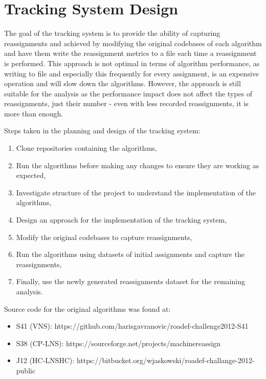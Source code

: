 \documentclass[a4paper,12pt]{Classes/RoboticsLaTeX}
\begin{document}
\section{Tracking System Design}

The goal of the tracking system is to provide the ability of capturing
reassignments and achieved by modifying the original codebases of each
algorithm and have them write the reassignment metrics to a file each
time a reassignment is performed. This approach is not optimal in terms
of algorithm performance, as writing to file and especially this
frequently for every assignment, is an expensive operation and will slow
down the algorithms. However, the approach is still suitable for the
analysis as the performance impact does not affect the types of
reassignments, just their number - even with less recorded
reassignments, it is more than enough.

Steps taken in the planning and design of the tracking system:

\begin{enumerate}
\def\labelenumi{\arabic{enumi}.}
\setlength\itemsep{0em}
\setlength\parskip{0pt}
\setlength\parsep{0pt}
\item Clone repositories containing the algorithms,
\item Run the algorithms before making any changes to ensure they are working as expected,
\item Investigate structure of the project to understand the implementation of the algorithms,
\item Design an approach for the implementation of the tracking system,
\item Modify the original codebases to capture reassignments,
\item Run the algorithms using datasets of initial assignments and capture the reassignments,
\item Finally, use the newly generated reassignments dataset for the remaining analysis.
\end{enumerate}

Source code for the original algorithms was found at:

\begin{itemize} \setlength\itemsep{0em} \setlength\parskip{0pt} \setlength\parsep{0pt}
    \item S41 (VNS): https://github.com/harisgavranovic/roadef-challenge2012-S41
    \item S38 (CP-LNS): https://sourceforge.net/projects/machinereassign
    \item J12 (HC-LNSHC): https://bitbucket.org/wjaskowski/roadef-challange-2012-public
\end{itemize}
\end{document}
